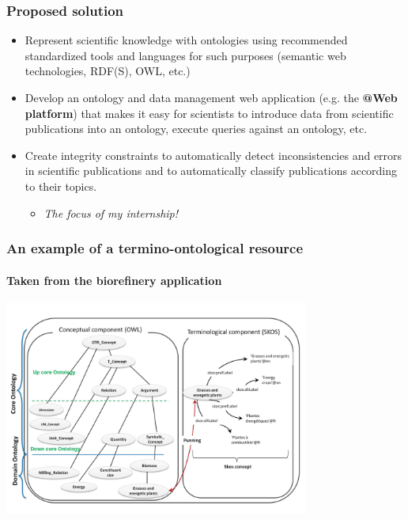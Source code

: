 \documentclass{beamer}
\begin{document}
\begin{frame}
  \frametitle{Proposed solution}

  \begin{itemize}
    \item Represent scientific knowledge with ontologies using recommended
      standardized tools and languages for such purposes (semantic web
      technologies, RDF(S), OWL, etc.)

    \pause

    \item Develop an ontology and data management web application (e.g. the
      \textbf{@Web platform}) that makes it easy for scientists to introduce
      data from scientific publications into an ontology, execute queries
      against an ontology, etc.

    \pause

    \item Create integrity constraints to automatically detect inconsistencies
      and errors in scientific publications and to automatically classify
      publications according to their topics.

    \pause

    \begin{itemize}
      \item \textit{The focus of my internship!}
    \end{itemize}

  \end{itemize}
\end{frame}

\begin{frame}
  \frametitle{An example of a termino-ontological resource}
  \framesubtitle{Taken from the biorefinery application}

  \begin{center}
    \includegraphics[width=10cm]{termino-ontological-resource.jpg}
  \end{center}
\end{frame}
\end{document}
